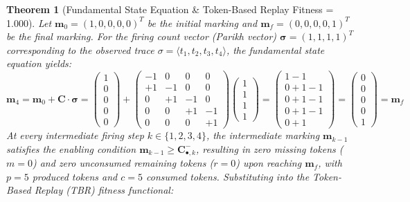 \documentclass[10pt,twoside,openany]{book}
\theoremstyle{plain}
\newtheorem{theorem}{Theorem}[chapter]
\theoremstyle{definition}
\theoremstyle{remark}
\begin{document}
\begin{theorem}[Fundamental State Equation \& Token-Based Replay Fitness = 1.000]
Let $\mathbf{m}_0 = (1, 0, 0, 0, 0)^T$ be the initial marking and $\mathbf{m}_f = (0, 0, 0, 0, 1)^T$ be the final marking. For the firing count vector (Parikh vector) $\boldsymbol{\sigma} = (1, 1, 1, 1)^T$ corresponding to the observed trace $\sigma = \langle t_1, t_2, t_3, t_4 \rangle$, the fundamental state equation yields:
\begin{equation}
\mathbf{m}_4 = \mathbf{m}_0 + \mathbf{C} \cdot \boldsymbol{\sigma} = \begin{pmatrix} 1 \\ 0 \\ 0 \\ 0 \\ 0 \end{pmatrix} + \begin{pmatrix}
-1 & 0 & 0 & 0 \\
+1 & -1 & 0 & 0 \\
0 & +1 & -1 & 0 \\
0 & 0 & +1 & -1 \\
0 & 0 & 0 & +1
\end{pmatrix} \begin{pmatrix} 1 \\ 1 \\ 1 \\ 1 \end{pmatrix} = \begin{pmatrix} 1 - 1 \\ 0 + 1 - 1 \\ 0 + 1 - 1 \\ 0 + 1 - 1 \\ 0 + 1 \end{pmatrix} = \begin{pmatrix} 0 \\ 0 \\ 0 \\ 0 \\ 1 \end{pmatrix} = \mathbf{m}_f
\end{equation}
At every intermediate firing step $k \in \{1, 2, 3, 4\}$, the intermediate marking $\mathbf{m}_{k-1}$ satisfies the enabling condition $\mathbf{m}_{k-1} \ge \mathbf{C}^-_{\bullet, k}$, resulting in zero missing tokens ($m = 0$) and zero unconsumed remaining tokens ($r = 0$) upon reaching $\mathbf{m}_f$, with $p = 5$ produced tokens and $c = 5$ consumed tokens. Substituting into the Token-Based Replay (TBR) fitness functional:
\begin{equation}

\end{equation}
\end{theorem}
\end{document}
